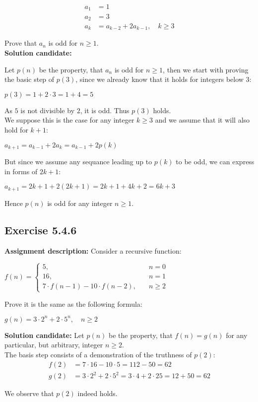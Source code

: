 \documentclass{report}
\newcommand{\cent}[1]{\begin{center}#1\end{center}}
\newcommand{\mAlign}[1]{\begin{align*}#1\end{align*}}
\newcommand{\stackedFunc}[3]{
	\begin{cases}
		#1 \\
		#2 \\
		#3
	\end{cases}}
\newcommand{\AssignmentDescription}{\textbf{Assignment description: }}
\newcommand{\Solution}{\textbf{Solution candidate: }}
\newcommand{\QED}{\boxed{}}
\newcommand{\Exercise}[1]{\subsection{Exercise #1}}
\begin{document}
 	\mAlign{
 		a_1 &= 1 \\
 		a_2 &= 3 \\
 		a_k &= a_{k-2} + 2 a_{k-1}, \quad k \geq 3
 	}
 
 	Prove that $a_n$ is odd for $n \geq 1$.\\
 	
 	\Solution
 	
 	Let $p(n)$ be the property, that  $a_n$ is odd for $n \geq 1$, then we start with proving the basic step of $p(3)$, since we already know that it holds for integers below 3:
 	
 	\cent{$p(3) = 1 + 2 \cdot 3 = 1+ 4= 5$}
 	
 	As $5$ is not divisible by $2$, it is odd. Thus $p(3)$ holds.\\
 	
 	We suppose this is the case for any integer $k \geq 3$ and we assume that it will also hold for $k+1$:
 	
 	\cent{$a_{k+1} = a_{k-1} +2 a_k = a_{k-1} +2 p(k)$}
 	
 	But since we assume any sequance leading up to $p(k)$ to be odd, we can express in forms of $2k+1$:
 	
 	\cent{$a_{k+1} = 2k+1 + 2(2k+1) = 2k+1+4k+2 = 6k+3$}
 	
 	Hence $p(n)$ is odd for any integer $n\geq 1$.\\
 	\QED
 	
 	\Exercise{5.4.6}
 	
 	\AssignmentDescription
 	Consider a recursive function:
 	
 	\cent{$f(n) = \stackedFunc{5, \quad &n = 0}{16, \quad &n=1}{7 \cdot  f(n-1) - 10 \cdot f(n-2),\quad &n \geq 2}$}
 	
 	Prove it is the same as the following formula:
 	
 	\cent{$g(n) = 3 \cdot 2^n + 2 \cdot 5^n, \quad n \geq 2$}
 	
 	\Solution
 	Let $p(n)$ be the property, that $f(n) = g(n)$ for any particular, but arbitrary, integer $n \geq 2$.\\
 	
 	The basis step consists of a demonstration of the truthness of $p(2)$:
 	\mAlign{
 		f(2) &= 7 \cdot 16 - 10 \cdot 5 = 112 - 50 = 62 \\
 		g(2) &= 3 \cdot 2^2 + 2 \cdot 5^2 = 3 \cdot 4 + 2 \cdot 25 = 12 + 50 = 62
 	}
 
 	We observe that $p(2)$ indeed holds.\\
 	
\end{document}
